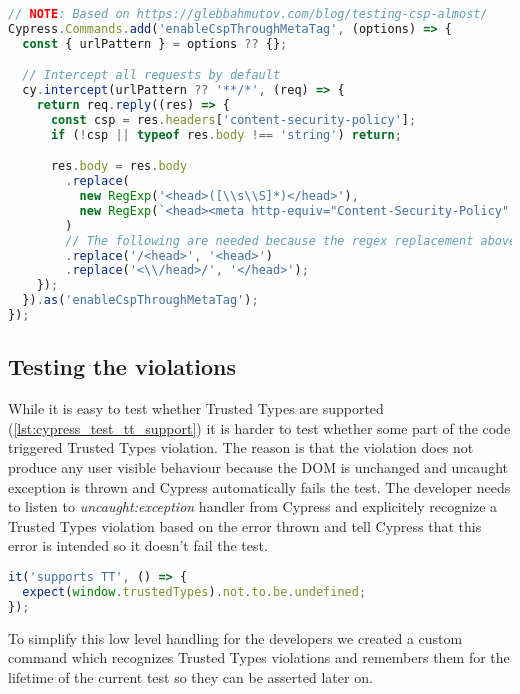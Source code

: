 \bigskip
\begin{lstlisting}[language=JavaScript, caption=Intercept requests and enable CSP header inside via meta tag]
// NOTE: Based on https://glebbahmutov.com/blog/testing-csp-almost/
Cypress.Commands.add('enableCspThroughMetaTag', (options) => {
  const { urlPattern } = options ?? {};

  // Intercept all requests by default
  cy.intercept(urlPattern ?? '**/*', (req) => {
    return req.reply((res) => {
      const csp = res.headers['content-security-policy'];
      if (!csp || typeof res.body !== 'string') return;

      res.body = res.body
        .replace(
          new RegExp('<head>([\\s\\S]*)</head>'),
          new RegExp(`<head><meta http-equiv="Content-Security-Policy" content="${csp}">$1</head>`).toString()
        )
        // The following are needed because the regex replacement above inserts some characters
        .replace('/<head>', '<head>')
        .replace('<\\/head>/', '</head>');
    });
  }).as('enableCspThroughMetaTag');
});
\end{lstlisting}

\subsection{Testing the violations}

While it is easy to test whether Trusted Types are supported (\ref{lst:cypress_test_tt_support}) it
is harder to test whether some part of the code triggered Trusted Types violation. The reason is
that the violation does not produce any user visible behaviour because the DOM is unchanged and
uncaught exception is thrown and Cypress automatically fails the test. The developer needs to listen
to \emph{uncaught:exception} handler from Cypress and explicitely recognize a Trusted Types
violation based on the error thrown and tell Cypress that this error is intended so it doesn't fail
the test.

\bigskip
\begin{lstlisting}[language=JavaScript, caption=Test Trusted Types support, label={lst:cypress_test_tt_support}]
it('supports TT', () => {
  expect(window.trustedTypes).not.to.be.undefined;
});
\end{lstlisting}

To simplify this low level handling for the developers we created a custom command which
recognizes Trusted Types violations and remembers them for the lifetime of the current test so they
can be asserted later on.

